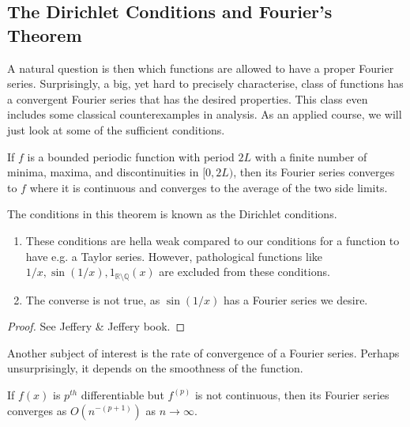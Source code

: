 \documentclass[a4paper]{article}
\begin{document}
\subsection{The Dirichlet Conditions and Fourier's Theorem}
A natural question is then which functions are allowed to have a proper Fourier series.
Surprisingly, a big, yet hard to precisely characterise, class of functions has a convergent Fourier series that has the desired properties.
This class even includes some classical counterexamples in analysis.
As an applied course, we will just look at some of the sufficient conditions.
\begin{theorem}
    If $f$ is a bounded periodic function with period $2L$ with a finite number of minima, maxima, and discontinuities in $[0,2L)$, then its Fourier series converges to $f$ where it is continuous and converges to the average of the two side limits.
\end{theorem}
The conditions in this theorem is known as the Dirichlet conditions.
\begin{note}
    \begin{enumerate}
        \item These conditions are hella weak compared to our conditions for a function to have e.g. a Taylor series.
        However, pathological functions like $1/x,\sin(1/x),1_{\mathbb R\setminus\mathbb Q}(x)$ are excluded from these conditions.
        \item The converse is not true, as $\sin(1/x)$ has a Fourier series we desire.
    \end{enumerate}
\end{note}
\begin{proof}
    See Jeffery \& Jeffery book.
\end{proof}
Another subject of interest is the rate of convergence of a Fourier series.
Perhaps unsurprisingly, it depends on the smoothness of the function.
\begin{theorem}
    If $f(x)$ is $p^{th}$ differentiable but $f^{(p)}$ is not continuous, then its Fourier series converges as $O(n^{-(p+1)})$ as $n\to\infty$.
\end{theorem}
\end{document}
